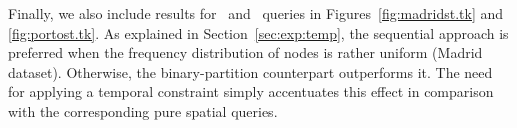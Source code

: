 Finally, we also include results for \STtk\ and \STtks\ queries in Figures~\ref{fig:madridst.tk} and \ref{fig:portost.tk}. 
As explained in Section~\ref{sec:exp:temp}, the sequential approach is preferred when the frequency distribution of nodes is
rather uniform (Madrid dataset). Otherwise, the binary-partition counterpart outperforms it. The need for applying a temporal
constraint simply accentuates this effect in comparison with the corresponding pure spatial queries.




